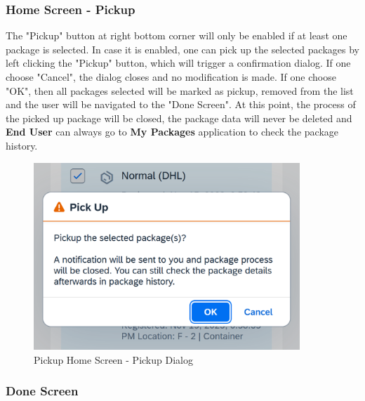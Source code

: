 
\subsubsection{Home Screen - Pickup}
The "Pickup" button at right bottom corner will only be enabled if at least one package is selected. In case it is enabled, one can pick up the selected packages by left clicking the "Pickup" button, which will trigger a confirmation dialog. If one choose "Cancel", the dialog closes and no modification is made. If one choose "OK", then all packages selected will be marked as pickup, removed from the list and the user will be navigated to the "Done Screen". At this point, the process of the picked up package will be closed, the package data will never be deleted and \textbf{End User} can always go to \textbf{My Packages} application to check the package history.

\begin{figure}[H]
	\centering
	\includegraphics[height=200pt]{images/user_doc/pickup/PickupDialog.png}
	\caption{Pickup Home Screen - Pickup Dialog}
	\label{fig:PickupDialog}
\end{figure}

\subsubsection{Done Screen}


